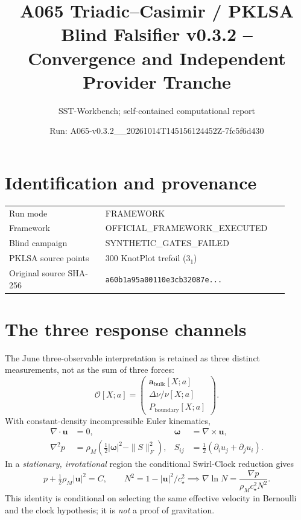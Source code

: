 \documentclass[10pt,a4paper]{article}
\title{A065 Triadic--Casimir / PKLSA\\ Blind Falsifier v0.3.2 -- Convergence and Independent Provider Tranche}
\author{SST-Workbench; self-contained computational report}
\date{Run: A065-v0.3.2\_\_20261014T145156124452Z-7fc5f6d430}
\begin{document}
\maketitle
\begin{center}
\end{center}
\section{Identification and provenance}
\begin{tabular}{@{}p{0.32\linewidth}p{0.60\linewidth}@{}}
\toprule
Run mode & FRAMEWORK \\
Framework & OFFICIAL\_FRAMEWORK\_EXECUTED \\
Blind campaign & SYNTHETIC\_GATES\_FAILED \\
PKLSA source points & 300 KnotPlot trefoil ($3_1$) \\
Original source SHA-256 & \texttt{a60b1a95a00110e3cb32087e...} \\
\bottomrule
\end{tabular}
\section{The three response channels}
The June three-observable interpretation is retained as three distinct measurements, not as the sum of three forces:
\[
\mathcal O[X;a]=\begin{pmatrix}
\mathbf a_{\mathrm{bulk}}[X;a]\\
\Delta\nu/\nu[X;a]\\
P_{\mathrm{boundary}}[X;a]
\end{pmatrix}.
\]
With constant-density incompressible Euler kinematics,
\begin{align}
\nabla\cdot\mathbf u&=0,&
\boldsymbol\omega&=\nabla\times\mathbf u,\\
\nabla^2p&=\rho_M\left(\tfrac12|\boldsymbol\omega|^2-\|S\|_F^2\right),&
S_{ij}&=\tfrac12(\partial_i u_j+\partial_j u_i).
\end{align}
In a \emph{stationary, irrotational} region the conditional Swirl-Clock reduction gives
\[
p+\tfrac12\rho_M|\mathbf u|^2=C,\qquad
N^2=1-|\mathbf u|^2/c_\star^2
\implies\nabla\ln N=\frac{\nabla p}{\rho_Mc_\star^2N^2}.
\]
This identity is conditional on selecting the same effective velocity in Bernoulli and the clock hypothesis; it is \emph{not} a proof of gravitation.
\end{document}
